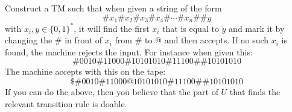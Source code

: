   Construct a TM such that when given a string of the form
  \[
  \# x_1 \# x_2 \# x_3 \# x_4 \# \cdots \# x_n \#\# y
  \]
  with $x_i, y \in \{0, 1\}^*$, it will find the first $x_i$
  that is equal to $y$ and mark it by changing the \# in front of
  $x_i$ from \# to @ and then accepts.
  If no such $x_i$ is found, the machine rejects the input.
  For instance when given this:
  \[
  \# 0010 \# 11000 \# 10101010 \# 11100  \#\# 10101010
  \]
  The machine accepts with this on the tape:
  \[
  \$\# 0010 \# 11000 @ 10101010 \# 11100  \#\# 10101010
  \]
  If you can do the above, then you believe that the part
  of $U$ that finds the relevant transition rule is doable.
